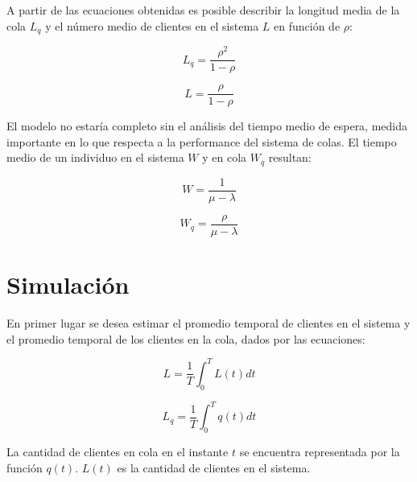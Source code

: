 \documentclass{sig-alternate}
\begin{document}
A partir de las ecuaciones obtenidas es posible describir la longitud media
de la cola $L_{q}$ y el n\'{u}mero medio de clientes en el sistema $L$ en 
funci\'{o}n de $\rho$:

\begin{equation}
\label{longitud_media_en_la_cola}
L_{q} = \frac{\rho^{2}}{1-\rho}
\end{equation}

\begin{equation}
\label{numero_medio_clientes_en_el_sistema}
L = \frac{\rho}{1-\rho}
\end{equation}


El modelo no estar\'{i}a completo sin el an\'{a}lisis del tiempo medio de 
espera, medida importante en lo que respecta a la performance del sistema
de colas. El tiempo medio de un individuo en el sistema $W$ y en cola $W_{q}$
resultan:

\begin{equation}
\label{tiempo_medio_en_el_sistema}
W = \frac{1}{\mu - \lambda}
\end{equation}

\begin{equation}
\label{tiempo_medio_en_la_cola}
W_{q} = \frac{\rho}{\mu - \lambda}
\end{equation}


\section{Simulaci\'{o}n}\label{simulacion}

En primer lugar se desea estimar el promedio temporal de clientes en el sistema
y el promedio temporal de los clientes en la cola, dados por las ecuaciones:

\begin{equation}
\label{estimo_promedio_temporal_clientes_sistema}
L = \frac{1}{T} \int_{0}^{T} L(t) dt
\end{equation}

\begin{equation}
\label{estimo_promedio_temporal_clientes_cola}
L_{q} = \frac{1}{T} \int_{0}^{T} q(t) dt
\end{equation}

La cantidad de clientes en cola en el instante $t$ se encuentra representada por
la funci\'{o}n $q(t)$. $L(t)$ es la cantidad de clientes en el sistema.
\end{document}
